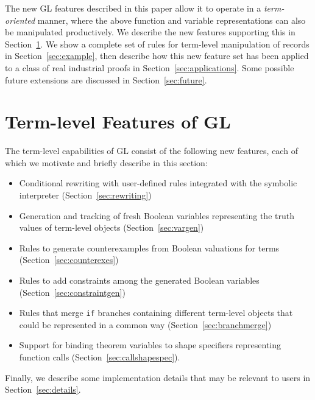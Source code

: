 \documentclass[submission,copyright,creativecommons]{eptcs}
\begin{document}
The new GL features described in this paper allow it to operate in a
{\em term-oriented} manner, where the above function and variable
representations can also be manipulated productively.  We describe the
new features supporting this in Section~\ref{sec:features}.  We show a
complete set of rules for term-level manipulation of records in
Section~\ref{sec:example}, then describe how this new feature set has
been applied to a class of real industrial proofs in
Section~\ref{sec:applications}. Some possible future extensions are
discussed in Section~\ref{sec:future}.

\section{Term-level Features of GL}
\label{sec:features}
The term-level capabilities of GL consist of the following new
features, each of which we motivate and briefly describe in this section:
\begin{itemize}
\item Conditional rewriting with user-defined rules integrated with the symbolic interpreter (Section~\ref{sec:rewriting})
\item Generation and tracking of fresh Boolean variables representing the truth values of term-level objects (Section~\ref{sec:vargen})
\item Rules to generate counterexamples from Boolean valuations for terms (Section~\ref{sec:counterexes})
\item Rules to add constraints among the generated Boolean variables (Section~\ref{sec:constraintgen})
\item Rules that merge \texttt{if} branches containing different term-level objects that could be represented in a common way (Section~\ref{sec:branchmerge})
\item Support for binding theorem variables to shape specifiers representing function calls (Section~\ref{sec:callshapespec}).
\end{itemize}
Finally, we describe some implementation details that may be relevant to users in Section~\ref{sec:details}.
\end{document}
